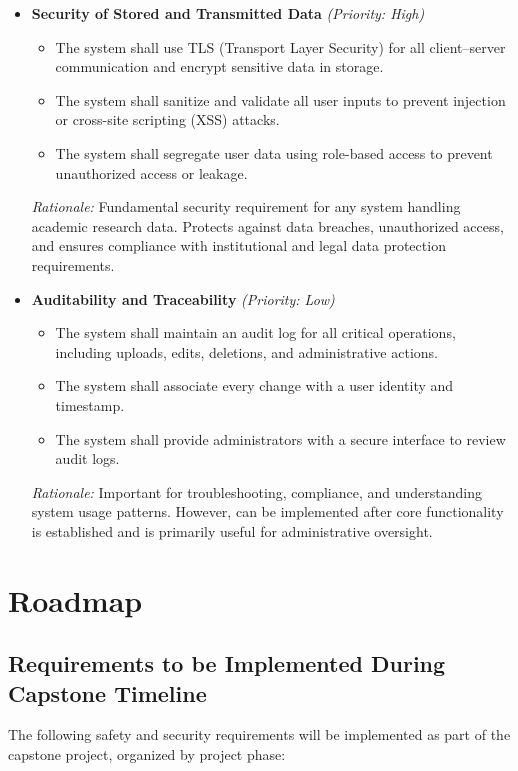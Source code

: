 \documentclass{article}
\begin{document}
\begin{itemize}
    \item \textbf{Security of Stored and Transmitted Data} \textit{(Priority: High)}
    \begin{itemize}
        \item The system shall use TLS (Transport Layer Security) for all client–server communication and encrypt sensitive data in storage.
        \item The system shall sanitize and validate all user inputs to prevent injection or cross-site scripting (XSS) attacks.
        \item The system shall segregate user data using role-based access to prevent unauthorized access or leakage.
    \end{itemize}
    \textit{Rationale:} Fundamental security requirement for any system handling academic research data. Protects against data breaches, unauthorized access, and ensures compliance with institutional and legal data protection requirements.

    \item \textbf{Auditability and Traceability} \textit{(Priority: Low)}
    \begin{itemize}
        \item The system shall maintain an audit log for all critical operations, including uploads, edits, deletions, and administrative actions.
        \item The system shall associate every change with a user identity and timestamp.
        \item The system shall provide administrators with a secure interface to review audit logs.
    \end{itemize}
    \textit{Rationale:} Important for troubleshooting, compliance, and understanding system usage patterns. However, can be implemented after core functionality is established and is primarily useful for administrative oversight.

\end{itemize}

\section{Roadmap}

\subsection{Requirements to be Implemented During Capstone Timeline}

The following safety and security requirements will be implemented as part of the capstone project, organized by project phase:
\end{document}
